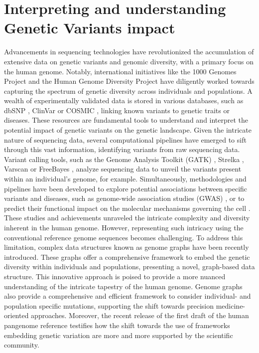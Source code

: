 \documentclass[a4paper, titlepage, openright]{book}
\begin{document}
\section{Interpreting and understanding Genetic Variants impact}
Advancements in sequencing technologies have revolutionized the accumulation of extensive data on genetic variants and genomic diversity, with a primary focus on the human genome. Notably, international initiatives like the 1000 Genomes Project \citep{siva20081000, 10002015global} and the Human Genome Diversity Project \citep{bergstrom2020insights} have diligently worked towards capturing the spectrum of genetic diversity across individuals and populations. A wealth of experimentally validated data is stored in various databases, such as dbSNP \citep{sherry2001dbsnp}, ClinVar \citep{landrum2020clinvar} or COSMIC \citep{bamford2004cosmic}, linking known variants to genetic traits or diseases. These resources are fundamental tools to understand and interpret the potential impact of genetic variants on the genetic landscape. Given the intricate nature of sequencing data, several computational pipelines have emerged to sift through this vast information, identifying variants from raw sequencing data. Variant calling tools, such as the Genome Analysis Toolkit (GATK) \citep{mckenna2010genome}, Strelka \citep{kim2018strelka2}, Varscan \citep{koboldt2012varscan} or FreeBayes \citep{garrison2012haplotype}, analyze sequencing data to unveil the variants present within an individual's genome, for example. Simultaneously, methodologies and pipelines have been developed to explore potential associations between specific variants and diseases, such as genome-wide association studies (GWAS) \citep{uffelmann2021genome}, or to predict their functional impact on the molecular mechanisms governing the cell \citep{mclaren2016ensembl}. These studies and achievements unraveled the intricate complexity and diversity inherent in the human genome. However, representing such intricacy using the conventional reference genome sequences becomes challenging. To address this limitation, complex data structures known as genome graphs \citep{paten2017genome} have been recently introduced. These graphs offer a comprehensive framework to embed the genetic diversity within individuals and populations, presenting a novel, graph-based data structure. This innovative approach is poised to provide a more nuanced understanding of the intricate tapestry of the human genome. Genome graphs also provide a comprehensive and efficient framework to consider individual- and population specific mutations, supporting the shift towards precision medicine-oriented approaches. Moreover, the recent release of the first draft of the human pangenome reference \citep{liao2023draft} testifies how the shift towards the use of frameworks embedding genetic variation are more and more supported by the scientific community.
\end{document}
